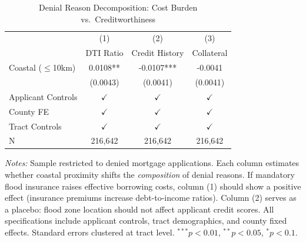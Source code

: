 \begin{table}[htbp]
\centering
\caption{Denial Reason Decomposition: Cost Burden vs.\ Creditworthiness}
\label{tab:mechanism}
\small
\begin{tabular}{lccc}
\hline\hline
 & (1) & (2) & (3) \\
 & DTI Ratio & Credit History & Collateral \\
\hline
Coastal ($\leq$10km) & 0.0108** & -0.0107*** & -0.0041 \\
 & (0.0043) & (0.0041) & (0.0041) \\
\hline
Applicant Controls & $\checkmark$ & $\checkmark$ & $\checkmark$ \\
County FE & $\checkmark$ & $\checkmark$ & $\checkmark$ \\
Tract Controls & $\checkmark$ & $\checkmark$ & $\checkmark$ \\
\hline
N & 216,642 & 216,642 & 216,642 \\
\hline\hline
\end{tabular}
\begin{tablenotes}[flushleft]\small
\item \textit{Notes:} Sample restricted to denied mortgage applications. Each column estimates whether coastal proximity shifts the \textit{composition} of denial reasons. If mandatory flood insurance raises effective borrowing costs, column (1) should show a positive effect (insurance premiums increase debt-to-income ratios). Column (2) serves as a placebo: flood zone location should not affect applicant credit scores. All specifications include applicant controls, tract demographics, and county fixed effects. Standard errors clustered at tract level. $^{***}p<0.01$, $^{**}p<0.05$, $^{*}p<0.1$.
\end{tablenotes}
\end{table}

